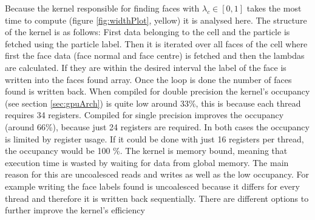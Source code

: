 Because the kernel responsible for finding faces with $\lambda_c \in [0,1]$ takes the most time to compute (figure \ref{fig:widthPlot}, yellow) it is analysed here. The structure of the kernel is as follows: First data belonging to the cell and the particle is fetched using the particle label. Then it is iterated over all faces of the cell where first the face data (face normal and face centre) is fetched and then the lambdas are calculated. If they are within the desired interval the label of the face is written into the faces found array. Once the loop is done the number of faces found is written back. When compiled for double precision the kernel's occupancy (see section \ref{sec:gpuArch}) is quite low around 33\%, this is because each thread requires 34 registers. Compiled for single precision improves the occupancy (around 66\%), because just 24 registers are required. In both cases the occupancy is limited by register usage. If it could be done with just 16 registers per thread, the occupancy would be 100 \%. The kernel is memory bound, meaning that execution time is wasted by waiting for data from global memory. The main reason for this are uncoalesced reads and writes as well as the low occupancy. For example writing the face labels found is uncoalesced because it differs for every thread and therefore it is written back sequentially. There are different options to further improve the kernel's efficiency

